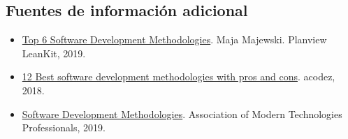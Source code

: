 \subsection{Fuentes de información adicional}
\begin{itemize}[nosep]
\item \href{https://leankit.com/blog/2019/03/top-6-software-development-methodologies/}{Top
  6 Software Development Methodologies}. Maja Majewski. Planview
  LeanKit, 2019.
\item \href{https://acodez.in/12-best-software-development-methodologies-pros-cons/}{12
  Best software development methodologies with pros and cons}. acodez,
  2018.
\item \href{http://www.itinfo.am/eng/software-development-methodologies/}{Software
  Development Methodologies}. Association of Modern Technologies
  Professionals, 2019.
\end{itemize}
